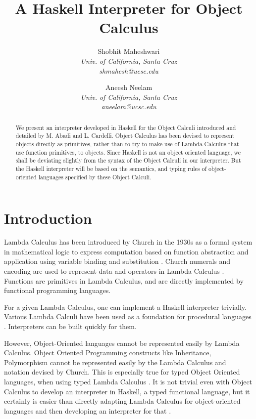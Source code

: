 \documentclass[10pt,twocolumn]{article}
\begin{document}
\title{A Haskell Interpreter for Object Calculus}

\author{
Shobhit Maheshwari \\
\textit{Univ. of California, Santa Cruz} \\
\textit{shmahesh@ucsc.edu}
\and
Aneesh Neelam \\
\textit{Univ. of California, Santa Cruz} \\
\textit{aneelam@ucsc.edu}
}

\maketitle
\thispagestyle{empty}

\begin{abstract}
We present an interpreter developed in Haskell for the Object Calculi introduced and detailed by M. Abadi and L. Cardelli.  Object Calculus has been devised to represent objects directly as primitives, rather than to try to make use of Lambda Calculus that use function primitives, to objects. Since Haskell is not an object oriented language, we shall be deviating slightly from the syntax of the Object Calculi in our interpreter. But the Haskell interpreter will be based on the semantics, and typing rules of object-oriented languages specified by these Object Calculi. 
\end{abstract}

\section{Introduction}

Lambda Calculus has been introduced by Church in the 1930s as a formal system in mathematical logic to express computation based on function abstraction and application using variable binding and substitution \cite{ex3, ex7}. Church numerals and encoding are used to represent data and operators in Lambda Calculus \cite{ex4}. Functions are primitives in Lambda Calculus, and are directly implemented by functional programming languages. 

For a given Lambda Calculus, one can implement a Haskell interpreter trivially. Various Lambda Calculi have been used as a foundation for procedural languages \cite{ex11}. Interpreters can be built quickly for them. 

However, Object-Oriented languages cannot be represented easily by Lambda Calculus. Object Oriented Programming constructs like Inheritance, Polymorphism cannot be represented easily by the Lambda Calculus and notation devised by Church. This is especially true for typed Object Oriented languages, when using typed Lambda Calculus \cite{ex1}. It is not trivial even with Object Calculus to develop an interpreter in Haskell, a typed functional language, but it certainly is easier than directly adapting Lambda Calculus for object-oriented languages and then developing an interpreter for that \cite{ex11}. 
\end{document}
